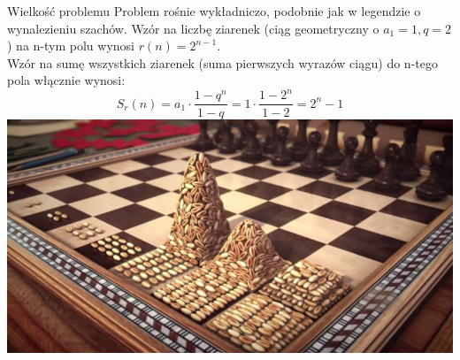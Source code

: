 \begin{frame}{Wielkość problemu}
    Problem rośnie wykładniczo, podobnie jak w legendzie o wynalezieniu szachów. Wzór na liczbę ziarenek (ciąg geometryczny o $a_1=1, q=2$) na n-tym polu wynosi $r(n) = 2^{n-1}$. \\
    Wzór na sumę wszystkich ziarenek (suma pierwszych wyrazów ciągu) do n-tego pola włącznie wynosi:
    \[ S_r(n) = a_1 \cdot \frac{1-q^n}{1-q} = 1 \cdot \frac{1-2^n}{1-2} = 2^n - 1 \]
    \centering
    \includegraphics[height=0.35\textheight]{recursion/graphics/chessboard1.png}
\end{frame}
